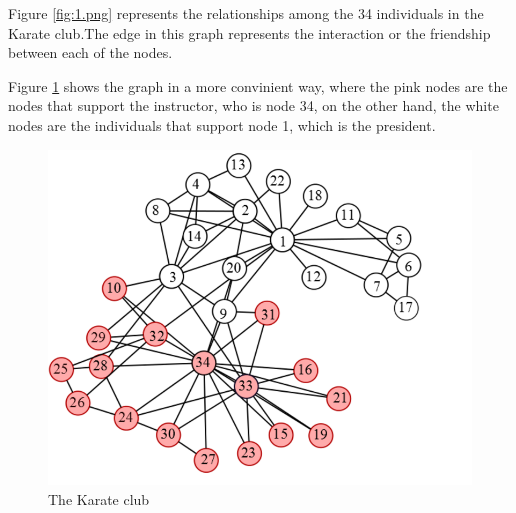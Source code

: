 \documentclass{article}
\begin{document}
Figure \ref{fig:1.png} represents the relationships among the 34 individuals in the Karate club.The edge in this graph represents the interaction or the friendship between each of the nodes.


Figure \ref{fig:2.png} shows the graph in a more convinient way, where the pink nodes are the nodes that support the instructor, who is node 34, on the other hand, the white nodes are the individuals that support node 1, which is the president.



\begin{figure}
\centering
\includegraphics[scale=0.75]{2.png}
\caption{The Karate club}
\label{fig:2.png}
\end{figure}
\newpage
\end{document}
